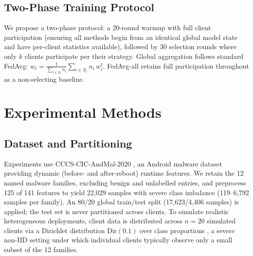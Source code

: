 \documentclass[conference]{IEEEtran}
\begin{document}
\subsection{Two-Phase Training Protocol}
We propose a two-phase protocol: a 20-round warmup with full client participation (ensuring all methods begin from an identical global model state and have per-client statistics available), followed by 30 selection rounds where only $k$ clients participate per their strategy. Global aggregation follows standard FedAvg: $w_t = \frac{1}{\sum_{i \in S_t} n_i}\sum_{i \in S_t} n_i\, w_i^t$. FedAvg-all retains full participation throughout as a non-selecting baseline.

\section{Experimental Methods}

\subsection{Dataset and Partitioning}
Experiments use CCCS-CIC-AndMal-2020 \cite{cicandmal2020, keyes2021entropLyzer}, an Android malware dataset providing dynamic (before- and after-reboot) runtime features. We retain the 12 named malware families, excluding benign and unlabelled entries, and preprocess 125 of 141 features to yield 22,029 samples with severe class imbalance (119--6,792 samples per family). An 80/20 global train/test split (17,623/4,406 samples) is applied; the test set is never partitioned across clients. To simulate realistic heterogeneous deployments, client data is distributed across $n=20$ simulated clients via a Dirichlet distribution $\text{Dir}(0.1)$ over class proportions \cite{hsu2019dirichlet}, a severe non-IID setting under which individual clients typically observe only a small subset of the 12 families.
\end{document}
